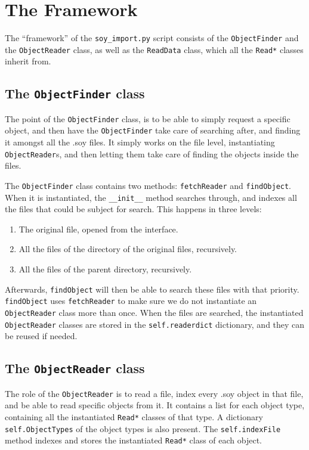 

\section*{The Framework}
The ``framework'' of the \texttt{soy\_import.py} script consists of the \texttt{ObjectFinder} and the \texttt{ObjectReader} class, as well as the \texttt{ReadData} class, which all the \texttt{Read*} classes inherit from.

\subsection*{The \texttt{ObjectFinder} class}
The point of the \texttt{ObjectFinder} class, is to be able to simply request a specific object, and then have the \texttt{ObjectFinder} take care of searching after, and finding it amongst all the .soy files. It simply works on the file level, instantiating \texttt{ObjectReader}s, and then letting them take care of finding the objects inside the files.

The \texttt{ObjectFinder} class contains two methods: \texttt{fetchReader} and \texttt{findObject}. When it is instantiated, the \texttt{\_\_init\_\_} method searches through, and indexes all the files that could be subject for search. This happens in three levels:
\begin{enumerate}
\item The original file, opened from the interface.
\item All the files of the directory of the original files, recursively.
\item All the files of the parent directory, recursively.
\end{enumerate}
Afterwards, \texttt{findObject} will then be able to search these files with that priority. \texttt{findObject} uses \texttt{fetchReader} to make sure we do not instantiate an \texttt{ObjectReader} class more than once. When the files are searched, the instantiated \texttt{ObjectReader} classes are stored in the \texttt{self.readerdict} dictionary, and they can be reused if needed.

\subsection*{The \texttt{ObjectReader} class}
The role of the \texttt{ObjectReader} is to read a file, index every .soy object in that file, and be able to read specific objects from it. It contains a list for each object type, containing all the instantiated \texttt{Read*} classes of that type. A dictionary \texttt{self.ObjectTypes} of the object types is also present. The \texttt{self.indexFile} method indexes and stores the instantiated \texttt{Read*} class of each object.

